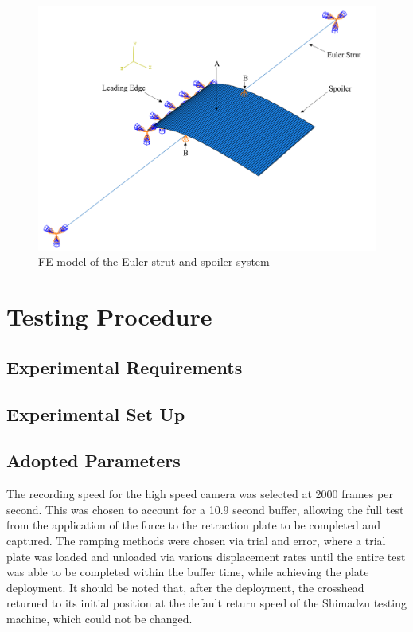 \documentclass{IEEEtran}
\begin{document}
    \begin{figure}[!h]
        \centering
        \includegraphics[width=\textwidth]{ModellingImages/ModelAssem.png}
        \caption{FE model of the Euler strut and spoiler system}
        \label{fig:ModelAssem}
    \end{figure}
	
    \section{Testing Procedure}

        \subsection{Experimental Requirements}
    
        \subsection{Experimental Set Up}
    
        \subsection{Adopted Parameters}
    
    
        The recording speed for the high speed camera was selected at 2000 frames per second. This was chosen to account for a 10.9 second buffer, allowing the full test from the application of the force to the retraction plate to be completed and captured. The ramping methods were chosen via trial and error, where a trial plate was loaded and unloaded via various displacement rates until the entire test was able to be completed within the buffer time, while achieving the plate deployment. It should be noted that, after the deployment, the crosshead returned to its initial position at the default return speed of the Shimadzu testing machine, which could not be changed.
    
\end{document}

